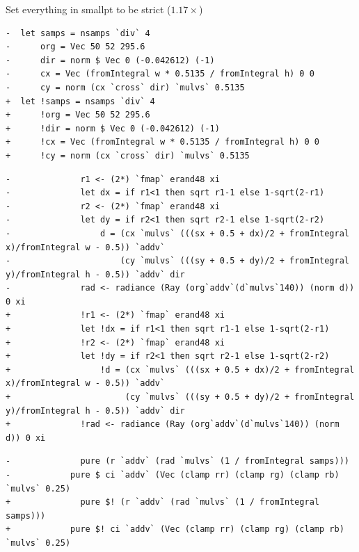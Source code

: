 \documentclass[8pt]{beamer}
\begin{document}

\begin{frame}[fragile]{Set everything in smallpt to be strict ($1.17\times$)}
\begin{verbatim}
-  let samps = nsamps `div` 4
-      org = Vec 50 52 295.6
-      dir = norm $ Vec 0 (-0.042612) (-1)
-      cx = Vec (fromIntegral w * 0.5135 / fromIntegral h) 0 0
-      cy = norm (cx `cross` dir) `mulvs` 0.5135
+  let !samps = nsamps `div` 4
+      !org = Vec 50 52 295.6
+      !dir = norm $ Vec 0 (-0.042612) (-1)
+      !cx = Vec (fromIntegral w * 0.5135 / fromIntegral h) 0 0
+      !cy = norm (cx `cross` dir) `mulvs` 0.5135

\end{verbatim}

\begin{verbatim}
-              r1 <- (2*) `fmap` erand48 xi
-              let dx = if r1<1 then sqrt r1-1 else 1-sqrt(2-r1)
-              r2 <- (2*) `fmap` erand48 xi
-              let dy = if r2<1 then sqrt r2-1 else 1-sqrt(2-r2)
-                  d = (cx `mulvs` (((sx + 0.5 + dx)/2 + fromIntegral x)/fromIntegral w - 0.5)) `addv`
-                      (cy `mulvs` (((sy + 0.5 + dy)/2 + fromIntegral y)/fromIntegral h - 0.5)) `addv` dir
-              rad <- radiance (Ray (org`addv`(d`mulvs`140)) (norm d)) 0 xi
+              !r1 <- (2*) `fmap` erand48 xi
+              let !dx = if r1<1 then sqrt r1-1 else 1-sqrt(2-r1)
+              !r2 <- (2*) `fmap` erand48 xi
+              let !dy = if r2<1 then sqrt r2-1 else 1-sqrt(2-r2)
+                  !d = (cx `mulvs` (((sx + 0.5 + dx)/2 + fromIntegral x)/fromIntegral w - 0.5)) `addv`
+                       (cy `mulvs` (((sy + 0.5 + dy)/2 + fromIntegral y)/fromIntegral h - 0.5)) `addv` dir
+              !rad <- radiance (Ray (org`addv`(d`mulvs`140)) (norm d)) 0 xi
\end{verbatim}

\begin{verbatim}
-              pure (r `addv` (rad `mulvs` (1 / fromIntegral samps)))
-            pure $ ci `addv` (Vec (clamp rr) (clamp rg) (clamp rb) `mulvs` 0.25)
+              pure $! (r `addv` (rad `mulvs` (1 / fromIntegral samps)))
+            pure $! ci `addv` (Vec (clamp rr) (clamp rg) (clamp rb) `mulvs` 0.25)
\end{verbatim}
\end{frame}
\end{document}
